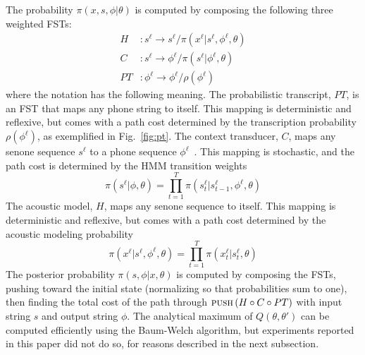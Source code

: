 The probability $\pi(x,s,\phi|\theta)$ is computed by composing the
following three weighted FSTs:
\begin{align}
  H&:s^\ell\rightarrow s^\ell/ \pi(x^\ell|s^\ell,\phi^\ell,\theta)\\
  C&:s^\ell\rightarrow \phi^\ell/ \pi(s^\ell|\phi^\ell,\theta)\\
  PT&:\phi^\ell\rightarrow\phi^\ell/ \rho(\phi^\ell)
\end{align}
where the notation has the following meaning.  The probabilistic
transcript, $PT$, is an FST that maps any phone string
to itself.  This mapping is deterministic
and reflexive, but comes with a path cost determined by the
transcription probability $\rho(\phi^\ell)$, as exemplified in
Fig.~\ref{fig:pt}.  The context transducer, $C$, maps any senone
sequence $s^\ell$ to a phone sequence $\phi^\ell$~\cite{mohri2008speech}.
This mapping is stochastic, and the path cost is determined by
the HMM transition weights
\begin{equation}
  \pi(s^\ell|\phi,\theta)=%
  \prod_{t=1}^T
  \pi(s_t^{\ell}\vert s_{t-1}^{\ell},\phi^\ell,\theta)
\end{equation}
The acoustic model, $H$, maps any senone sequence to
itself.  This mapping is deterministic and reflexive, but comes with a
path cost determined by the acoustic modeling probability
\begin{equation}
  \pi(x^\ell|s^\ell,\phi^\ell,\theta)=%
  \prod_{t=1}^T
  \pi(x_t^\ell|s_t^\ell,\theta)
\end{equation}
The posterior probability
$\pi(s,\phi|x,\theta)$ is computed by
composing the FSTs, pushing toward the initial state
(normalizing so that probabilities sum to one),
then finding the total cost of the path through
$\textsc{push}\left(H\circ C\circ PT\right)$
with input string $s$ and output string $\phi$.
The analytical maximum of $Q\left(\theta,\theta'\right)$
can be computed efficiently using
the Baum-Welch algorithm, but experiments reported in this
paper did not do so, for reasons described in the next subsection.
